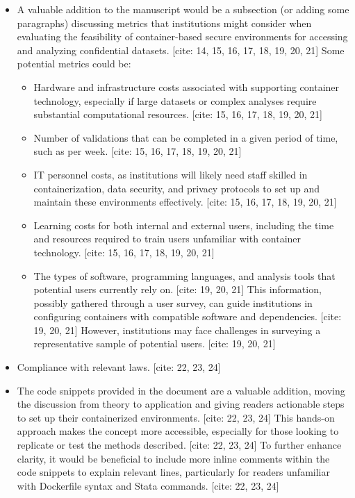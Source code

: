 \begin{referee}
\begin{itemize}
    \item A valuable addition to the manuscript would be a subsection (or adding some paragraphs) discussing metrics that institutions might consider when evaluating the feasibility of container-based secure environments for accessing and analyzing confidential datasets. [cite: 14, 15, 16, 17, 18, 19, 20, 21] Some potential metrics could be:
    \begin{itemize}
        \item Hardware and infrastructure costs associated with supporting container technology, especially if large datasets or complex analyses require substantial computational resources. [cite: 15, 16, 17, 18, 19, 20, 21]
        \item Number of validations that can be completed in a given period of time, such as per week. [cite: 15, 16, 17, 18, 19, 20, 21]
        \item IT personnel costs, as institutions will likely need staff skilled in containerization, data security, and privacy protocols to set up and maintain these environments effectively. [cite: 15, 16, 17, 18, 19, 20, 21]
        \item Learning costs for both internal and external users, including the time and resources required to train users unfamiliar with container technology. [cite: 15, 16, 17, 18, 19, 20, 21]
        \item The types of software, programming languages, and analysis tools that potential users currently rely on. [cite: 19, 20, 21] This information, possibly gathered through a user survey, can guide institutions in configuring containers with compatible software and dependencies. [cite: 19, 20, 21] However, institutions may face challenges in surveying a representative sample of potential users. [cite: 19, 20, 21]
    \end{itemize}
    \item Compliance with relevant laws. [cite: 22, 23, 24]
    \item  The code snippets provided in the document are a valuable addition, moving the discussion from theory to application and giving readers actionable steps to set up their containerized environments. [cite: 22, 23, 24] This hands-on approach makes the concept more accessible, especially for those looking to replicate or test the methods described. [cite: 22, 23, 24] To further enhance clarity, it would be beneficial to include more inline comments within the code snippets to explain relevant lines, particularly for readers unfamiliar with Dockerfile syntax and Stata commands. [cite: 22, 23, 24]

\end{itemize}
\end{referee}
